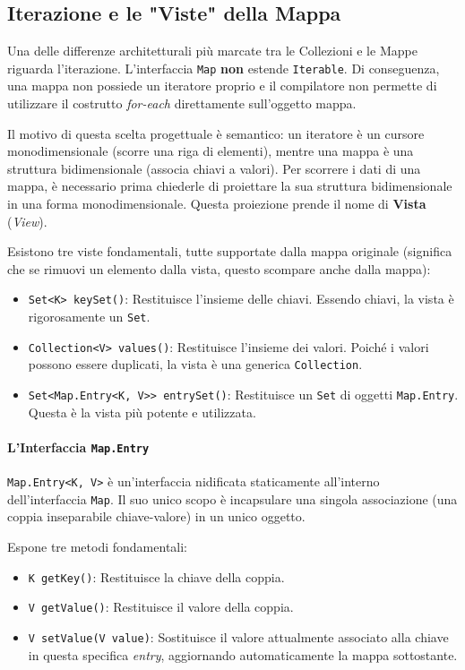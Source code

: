 \subsection{Iterazione e le "Viste" della Mappa}

Una delle differenze architetturali più marcate tra le Collezioni e le Mappe riguarda l'iterazione. L'interfaccia \texttt{Map} \textbf{non} estende \texttt{Iterable}. Di conseguenza, una mappa non possiede un iteratore proprio e il compilatore non permette di utilizzare il costrutto \textit{for-each} direttamente sull'oggetto mappa.

Il motivo di questa scelta progettuale è semantico: un iteratore è un cursore monodimensionale (scorre una riga di elementi), mentre una mappa è una struttura bidimensionale (associa chiavi a valori). Per scorrere i dati di una mappa, è necessario prima chiederle di proiettare la sua struttura bidimensionale in una forma monodimensionale. Questa proiezione prende il nome di \textbf{Vista} (\textit{View}).

Esistono tre viste fondamentali, tutte supportate dalla mappa originale (significa che se rimuovi un elemento dalla vista, questo scompare anche dalla mappa):

\begin{itemize}
    \item \texttt{Set<K> keySet()}: Restituisce l'insieme delle chiavi. Essendo chiavi, la vista è rigorosamente un \texttt{Set}.
    \item \texttt{Collection<V> values()}: Restituisce l'insieme dei valori. Poiché i valori possono essere duplicati, la vista è una generica \texttt{Collection}.
    \item \texttt{Set<Map.Entry<K, V>> entrySet()}: Restituisce un \texttt{Set} di oggetti \texttt{Map.Entry}. Questa è la vista più potente e utilizzata.
\end{itemize}

\paragraph{L'Interfaccia \texttt{Map.Entry}}

\texttt{Map.Entry<K, V>} è un'interfaccia nidificata staticamente all'interno dell'interfaccia \texttt{Map}. Il suo unico scopo è incapsulare una singola associazione (una coppia inseparabile chiave-valore) in un unico oggetto. 

Espone tre metodi fondamentali:
\begin{itemize}
    \item \texttt{K getKey()}: Restituisce la chiave della coppia.
    \item \texttt{V getValue()}: Restituisce il valore della coppia.
    \item \texttt{V setValue(V value)}: Sostituisce il valore attualmente associato alla chiave in questa specifica \textit{entry}, aggiornando automaticamente la mappa sottostante.
\end{itemize}

